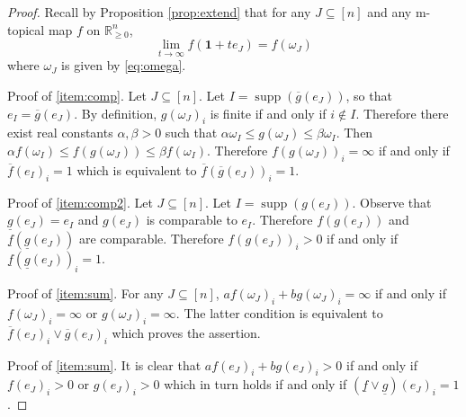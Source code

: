 \documentclass[10pt,reqno]{amsart}
\newcommand{\R}{\mathbb{R}}
\newcommand{\supp}{\operatorname{supp}}
\newcommand{\sign}{\operatorname{sgn}}
\theoremstyle{plain}
\theoremstyle{definition}
\numberwithin{equation}{section}
\begin{document}
\begin{proof}
Recall by Proposition \ref{prop:extend} that for any $J \subseteq [n]$ and any m-topical map $f$ on $\R^n_{\ge 0}$, 
$$\lim_{t \rightarrow \infty} f(\mathbf{1} + te_J) = f(\omega_J)$$
where $\omega_J$ is given by \eqref{eq:omega}.

Proof of \eqref{item:comp}. Let $J \subseteq [n]$.  Let $I = \supp(\overline{g}(e_J))$, so that $e_I = \overline{g}(e_J)$.  By definition, $g(\omega_J)_i$ is finite if and only if $i \notin I$.  Therefore there exist real constants $\alpha, \beta > 0$ such that $\alpha \omega_I \le g(\omega_J) \le \beta \omega_I$.  Then $\alpha f(\omega_I) \le f(g(\omega_J)) \le \beta f(\omega_I)$.  Therefore $f(g(\omega_J))_i = \infty$ if and only if $\overline{f}(e_I)_i = 1$ which is equivalent to $\overline{f}(\overline{g}(e_J))_i = 1$.  

Proof of \eqref{item:comp2}. Let $J \subseteq [n]$.  Let $I = \supp(g(e_J))$. Observe that $\underline{g}(e_J) = e_I$ and $g(e_J)$ is comparable to $e_I$.  Therefore $f(g(e_J))$ and $\underline{f}(\underline{g}(e_J))$ are comparable.  Therefore $f(g(e_J))_i > 0$ if and only if $\underline{f}(\underline{g}(e_J))_i = 1$.  


Proof of \eqref{item:sum}. %
For any $J \subseteq [n]$, $ af(\omega_J)_i + bg(\omega_J)_i  = \infty$ if and only if $f(\omega_J)_i = \infty$  or  $g(\omega_J)_i = \infty.$ The latter condition is equivalent to $\overline{f}(e_J)_i \vee \overline{g}(e_J)_i$ which proves the assertion.

Proof of \eqref{item:sum}. It is clear that $a f(e_J)_i + b g(e_J)_i > 0$ if and only if $f(e_J)_i > 0$ or $g(e_J)_i > 0$ which in turn holds if and only if $(\underline{f} \vee \underline{g})(e_J)_i = 1$.
\end{proof}
\end{document}
